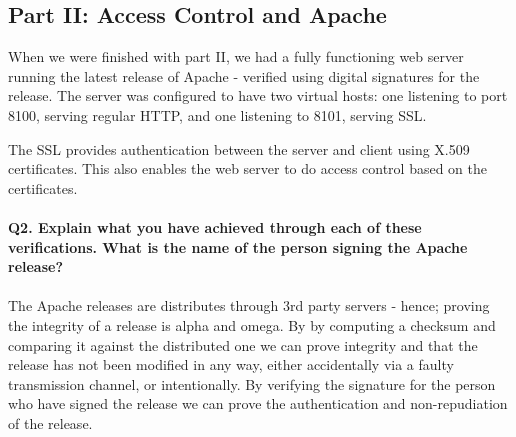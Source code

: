 \documentclass[a4paper, 12pt]{article}
\begin{document}
\subsection{Part II: Access Control and Apache}
When we were finished with part II, we had a fully functioning web server running the latest release of Apache - verified using digital signatures for the release. The server was configured to have two virtual hosts: one listening to port 8100, serving regular HTTP, and one listening to 8101, serving SSL.

The SSL provides authentication between the server and client using X.509 certificates. This also enables the web server to do access control based on the certificates.
\\ \\
{\bf Q2. Explain what you have achieved through each of these verifications. What is the name
of the person signing the Apache release?} \\
\\
The Apache releases are distributes through 3rd party servers - hence; proving the integrity of a release is alpha and omega. By by computing a checksum and comparing it against the distributed one we can prove integrity and that the release has not been modified in any way, either accidentally via a faulty transmission channel, or intentionally\cite{tre}. By verifying the signature for the person who have signed the release we can prove the authentication and non-repudiation of the release\cite{fire}.
\end{document}
